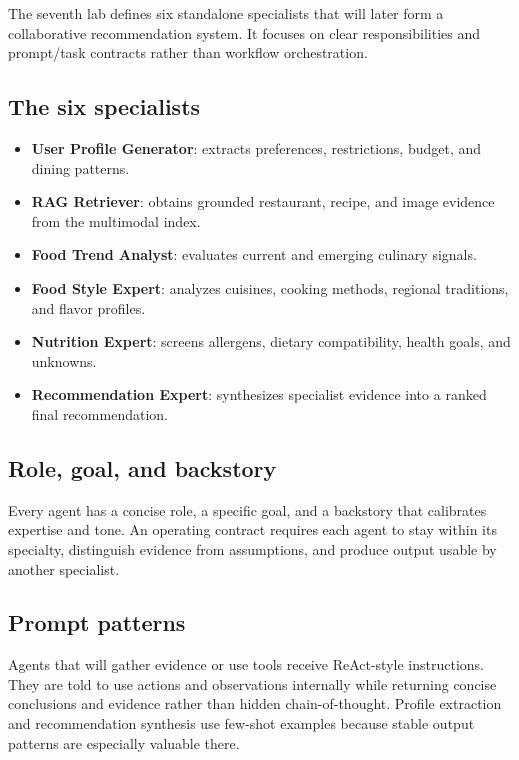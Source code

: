 \documentclass[11pt]{article}
\begin{document}
The seventh lab defines six standalone specialists that will later form a
collaborative recommendation system. It focuses on clear responsibilities and
prompt/task contracts rather than workflow orchestration.

\subsection{The six specialists}

\begin{itemize}
  \item \textbf{User Profile Generator}: extracts preferences, restrictions,
        budget, and dining patterns.
  \item \textbf{RAG Retriever}: obtains grounded restaurant, recipe, and image
        evidence from the multimodal index.
  \item \textbf{Food Trend Analyst}: evaluates current and emerging culinary
        signals.
  \item \textbf{Food Style Expert}: analyzes cuisines, cooking methods, regional
        traditions, and flavor profiles.
  \item \textbf{Nutrition Expert}: screens allergens, dietary compatibility,
        health goals, and unknowns.
  \item \textbf{Recommendation Expert}: synthesizes specialist evidence into a
        ranked final recommendation.
\end{itemize}

\subsection{Role, goal, and backstory}

Every agent has a concise role, a specific goal, and a backstory that calibrates
expertise and tone. An operating contract requires each agent to stay within
its specialty, distinguish evidence from assumptions, and produce output usable
by another specialist.

\subsection{Prompt patterns}

Agents that will gather evidence or use tools receive ReAct-style instructions.
They are told to use actions and observations internally while returning concise
conclusions and evidence rather than hidden chain-of-thought. Profile extraction
and recommendation synthesis use few-shot examples because stable output
patterns are especially valuable there.
\end{document}
